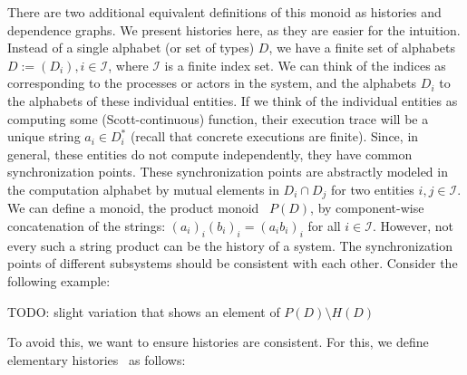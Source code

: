 There are two additional equivalent definitions of this monoid as histories and dependence graphs.
We present histories here, as they are easier for the intuition.
Instead of a single alphabet (or set of types) $D$, we have a finite set of alphabets $D := (D_i), i \in \mathcal{I}$, where $\mathcal{I}$ is a finite index set.
We can think of the indices as corresponding to the processes or actors in the system, and the alphabets $D_i$ to the alphabets of these individual entities.
If we think of the individual entities as computing some (Scott-continuous) function, their execution trace will be a unique string $a_i \in D_i^*$ (recall that concrete executions are finite).
Since, in general, these entities do not compute independently, they have common synchronization points.
These synchronization points are abstractly modeled in the computation alphabet by mutual elements in $D_i \cap D_j$ for two entities $i,j \in \mathcal{I}$.
We can define a monoid, the product monoid~ $P(D)$, by component-wise concatenation of the strings: $(a_i)_i (b_i)_i = (a_ib_i)_i$ for all $i \in \mathcal{I}$.
However, not every such a string product can be the history of a system.
The synchronization points of different subsystems should be consistent with each other. Consider the following example:
\begin{ex}
  \label{ex:inconsistency_history}
TODO: slight variation that shows an element of $P(D) \setminus H(D)$
\end{ex}
To avoid this, we want to ensure histories are consistent. For this, we define elementary histories~ as follows:
